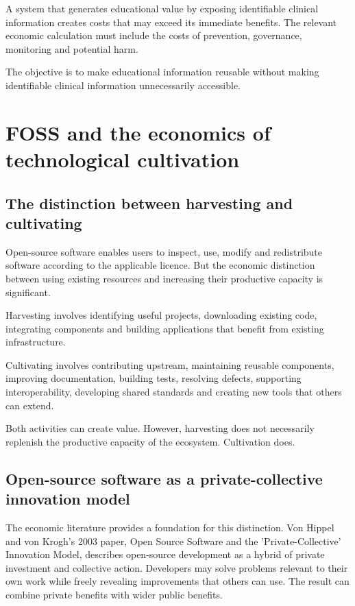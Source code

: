 \documentclass[11pt,a4paper]{article}
\begin{document}
A system that generates educational value by exposing identifiable clinical information creates costs that may exceed its immediate benefits. The relevant economic calculation must include the costs of prevention, governance, monitoring and potential harm.

The objective is to make educational information reusable without making identifiable clinical information unnecessarily accessible.

\section{FOSS and the economics of technological cultivation}
\subsection{The distinction between harvesting and cultivating}
Open-source software enables users to inspect, use, modify and redistribute software according to the applicable licence. But the economic distinction between using existing resources and increasing their productive capacity is significant.

Harvesting involves identifying useful projects, downloading existing code, integrating components and building applications that benefit from existing infrastructure.

Cultivating involves contributing upstream, maintaining reusable components, improving documentation, building tests, resolving defects, supporting interoperability, developing shared standards and creating new tools that others can extend.

Both activities can create value. However, harvesting does not necessarily replenish the productive capacity of the ecosystem. Cultivation does.

\subsection{Open-source software as a private-collective innovation model}
The economic literature provides a foundation for this distinction. Von Hippel and von Krogh's 2003 paper, Open Source Software and the 'Private-Collective' Innovation Model, describes open-source development as a hybrid of private investment and collective action. Developers may solve problems relevant to their own work while freely revealing improvements that others can use. The result can combine private benefits with wider public benefits.
\end{document}
